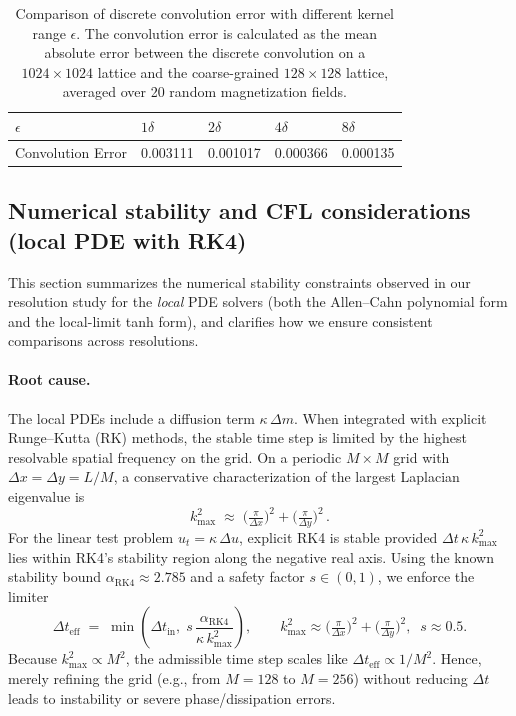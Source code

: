 \documentclass[11pt,a4paper]{article}
\begin{document}
\begin{table}
    \centering
    \begin{tabular}{lllll}
        \hline
        \hline
        \textbf{$\epsilon$} & $1\delta$ & $2\delta$ & $4\delta$ & $8\delta$ \\
        \hline
        Convolution Error & 0.003111 & 0.001017 & 0.000366 & 0.000135\\
        \hline
        \hline
    \end{tabular}
    \caption{Comparison of discrete convolution error with different kernel range $\epsilon$. The convolution error is calculated as the mean absolute error between the discrete convolution on a $1024\times 1024$ lattice and the coarse-grained $128 \times 128$ lattice, averaged over 20 random magnetization fields.}
    \label{tab:convolution_error}
\end{table}

\subsection{Numerical stability and CFL considerations (local PDE with RK4)}
\label{subsec:numerical_cfl}

This section summarizes the numerical stability constraints observed in our resolution study for the \emph{local} PDE solvers (both the Allen--Cahn polynomial form and the local-limit tanh form), and clarifies how we ensure consistent comparisons across resolutions.

\paragraph{Root cause.} The local PDEs include a diffusion term $\kappa\,\Delta m$. When integrated with explicit Runge--Kutta (RK) methods, the stable time step is limited by the highest resolvable spatial frequency on the grid. On a periodic $M\times M$ grid with $\Delta x=\Delta y=L/M$, a conservative characterization of the largest Laplacian eigenvalue is
\[
  k_\text{max}^2 \;\approx\; \Big(\tfrac{\pi}{\Delta x}\Big)^2 + \Big(\tfrac{\pi}{\Delta y}\Big)^2\,.
\]
For the linear test problem $u_t=\kappa\,\Delta u$, explicit RK4 is stable provided $\Delta t\,\kappa\,k_\text{max}^2$ lies within RK4's stability region along the negative real axis. Using the known stability bound $\alpha_\text{RK4}\approx 2.785$ and a safety factor $s\in(0,1)$, we enforce the limiter
\begin{equation}
  \Delta t_\text{eff} \;=\; \min\!\left( \Delta t_\text{in},\; s\,\frac{\alpha_\text{RK4}}{\kappa\,k_\text{max}^2} \right),
  \qquad k_\text{max}^2\approx \Big(\tfrac{\pi}{\Delta x}\Big)^2+\Big(\tfrac{\pi}{\Delta y}\Big)^2,\;\; s\approx 0.5.
  \label{eq:rk4_cfl}
\end{equation}
Because $k_\text{max}^2\propto M^2$, the admissible time step scales like $\Delta t_\text{eff}\propto 1/M^2$. Hence, merely refining the grid (e.g., from $M=128$ to $M=256$) without reducing $\Delta t$ leads to instability or severe phase/dissipation errors.
\end{document}
